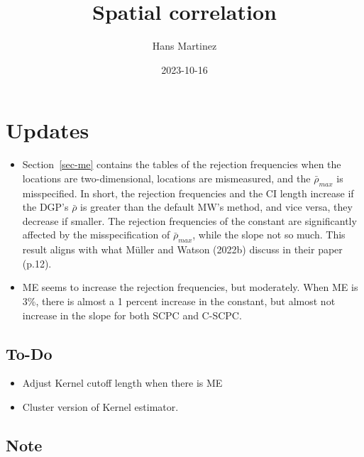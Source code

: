 \documentclass[
]{article}
\title{Spatial correlation}
\author{Hans Martinez}
\date{2023-10-16}
\providecommand{\tightlist}{%
  \setlength{\itemsep}{0pt}\setlength{\parskip}{0pt}}\usepackage{longtable,booktabs,array}
\begin{document}
\maketitle
\ifdefined\Shaded\renewenvironment{Shaded}{\begin{tcolorbox}[borderline west={3pt}{0pt}{shadecolor}, sharp corners, boxrule=0pt, interior hidden, breakable, frame hidden, enhanced]}{\end{tcolorbox}}\fi

\hypertarget{updates}{%
\section*{Updates}\label{updates}}

\begin{itemize}
\tightlist
\item
  Section~\ref{sec-me} contains the tables of the rejection frequencies
  when the locations are two-dimensional, locations are mismeasured, and
  the \(\bar\rho_{max}\) is misspecified. In short, the rejection
  frequencies and the CI length increase if the DGP's \(\bar\rho\) is
  greater than the default MW's method, and vice versa, they decrease if
  smaller. The rejection frequencies of the constant are significantly
  affected by the misspecification of \(\bar\rho_{max}\), while the
  slope not so much. This result aligns with what Müller and Watson
  (2022b) discuss in their paper (p.12).
\item
  ME seems to increase the rejection frequencies, but moderately. When
  ME is 3\%, there is almost a 1 percent increase in the constant, but
  almost not increase in the slope for both SCPC and C-SCPC.
\end{itemize}

\hypertarget{to-do}{%
\subsection*{To-Do}\label{to-do}}

\begin{itemize}
\tightlist
\item
  Adjust Kernel cutoff length when there is ME
\item
  Cluster version of Kernel estimator.
\end{itemize}

\hypertarget{note}{%
\subsection*{Note}\label{note}}
\end{document}
